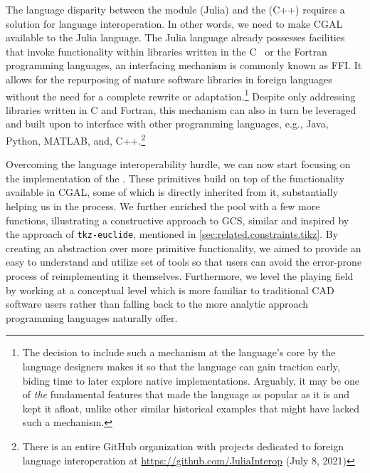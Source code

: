 The language disparity between the \primitives{} module (Julia) and the
\geomlibrary{} (C++) requires a solution for language interoperation.  In other
words, we need to make \ac{CGAL} available to the Julia language.  The Julia
language already possesses facilities that invoke functionality within libraries
written in the C~\cite{Kernighan:1988:C} or the
Fortran~\cite{Backus:1957:Fortran} programming languages, an interfacing
mechanism is commonly known as \ac{FFI}.  It allows for the repurposing of
mature software libraries in foreign languages without the need for a complete
rewrite or adaptation.\footnote{The decision to include such a mechanism at the
language's core by the language designers makes it so that the language can gain
traction early, biding time to later explore native implementations.  Arguably,
it may be one of \textit{the} fundamental features that made the language as
popular as it is and kept it afloat, unlike other similar historical examples
that might have lacked such a mechanism.}  Despite only addressing libraries
written in C and Fortran, this mechanism can also in turn be leveraged and built
upon to interface with other programming languages, e.g., Java, Python, MATLAB,
and, C++.\footnote{There is an entire GitHub organization with projects
dedicated to foreign language interoperation at
\url{https://github.com/JuliaInterop} (July 8, 2021)}

Overcoming the language interoperability hurdle, we can now start focusing on
the implementation of the \primitives{}.  These primitives build on top of the
functionality available in \ac{CGAL}, some of which is directly inherited from
it, substantially helping us in the process.  We further enriched the pool with
a few more functions, illustrating a constructive approach to \ac{GCS}, similar
and inspired by the approach of \texttt{tkz-euclide}, mentioned in
\cref{sec:related.constraints.tikz}.  By creating an abstraction over more
primitive functionality, we aimed to provide an easy to understand and utilize
set of tools so that users can avoid the error-prone process of reimplementing
it themselves.  Furthermore, we level the playing field by working at a
conceptual level which is more familiar to traditional \ac{CAD} software users
rather than falling back to the more analytic approach programming languages
naturally offer.

